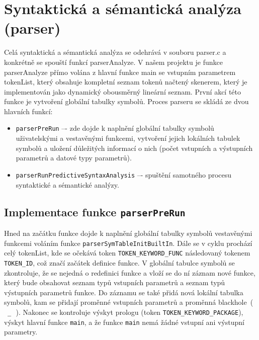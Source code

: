 \documentclass[a4paper, 12pt]{article}
\begin{document}
\section{Syntaktická a sémantická analýza (parser)}
Celá syntaktická a sémantická analýza se odehrává v souboru parser.c a konkrétně se spouští funkcí parserAnalyze.
\newline
\newline
V našem projektu je funkce parserAnalyze přímo volána z hlavní funkce main se vstupním parametrem tokenList, který obsahuje kompletní seznam tokenů načtený skenerem, který je implementován jako dynamický obousměrný lineární seznam. První akcí této funkce je vytvoření globální tabulky symbolů.
\newline
\newline
Proces parseru se skládá ze dvou hlavních funkcí:

\begin{itemize}

    \item \verb|parserPreRun| –- zde dojde k naplnění globální tabulky symbolů uživatelskými a vestavěnými funkcemi, vytvoření jejich lokálních tabulek symbolů a uložení důležitých informací o nich (počet vstupních a výstupních parametrů a datové typy parametrů).
    \item \verb|parserRunPredictiveSyntaxAnalysis| –- spuštění samotného procesu syntaktické a sémantické analýzy.
    
\end{itemize}





\subsection{Implementace funkce \protect\Verb|parserPreRun|}
Hned na začátku funkce dojde k naplnění globální tabulky symbolů vestavěnými funkcemi voláním funkce \verb|parserSymTableInitBuiltIn|.
\newline
\newline
Dále se v cyklu prochází celý tokenList, kde se očekává token \verb|TOKEN_KEYWORD_FUNC| následovaný tokenem \verb|TOKEN_ID|, což značí začátek definice funkce. V globální tabulce symbolů se zkontroluje, že se nejedná o redefinici funkce a vloží se do ní záznam nové funkce, který bude obsahovat seznam typů vstupních parametrů a seznam typů výstupních parametrů funkce. Do záznamu se také přidá nová lokální tabulka symbolů, kam se přidají proměnné vstupních parametrů a proměnná blackhole~(\,~\verb|_|\,~).
\newline
\newline
Nakonec se kontroluje výskyt prologu (token \verb|TOKEN_KEYWORD_PACKAGE|), výskyt hlavní funkce \verb|main|, a že funkce \verb|main| nemá žádné vstupní ani výstupní parametry.
\end{document}
